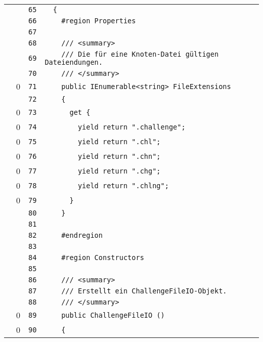 \documentclass[a4paper,10pt]{article}
\begin{document}
\begin{longtable}[l]{lrrl}
\cellcolor{gray} &  & \verb~65~ & \verb~  {~\\
\cellcolor{gray} &  & \verb~66~ & \verb~    #region Properties~\\
\cellcolor{gray} &  & \verb~67~ & \verb~~\\
\cellcolor{gray} &  & \verb~68~ & \verb~    /// <summary>~\\
\cellcolor{gray} &  & \verb~69~ & \verb~    /// Die für eine Knoten-Datei gültigen Dateiendungen.~\\
\cellcolor{gray} &  & \verb~70~ & \verb~    /// </summary>~\\
\cellcolor{red} & 0 & \verb~71~ & \verb~    public IEnumerable<string> FileExtensions~\\
\cellcolor{gray} &  & \verb~72~ & \verb~    {~\\
\cellcolor{red} & 0 & \verb~73~ & \verb~      get {~\\
\cellcolor{red} & 0 & \verb~74~ & \verb~        yield return ".challenge";~\\
\cellcolor{red} & 0 & \verb~75~ & \verb~        yield return ".chl";~\\
\cellcolor{red} & 0 & \verb~76~ & \verb~        yield return ".chn";~\\
\cellcolor{red} & 0 & \verb~77~ & \verb~        yield return ".chg";~\\
\cellcolor{red} & 0 & \verb~78~ & \verb~        yield return ".chlng";~\\
\cellcolor{red} & 0 & \verb~79~ & \verb~      }~\\
\cellcolor{gray} &  & \verb~80~ & \verb~    }~\\
\cellcolor{gray} &  & \verb~81~ & \verb~~\\
\cellcolor{gray} &  & \verb~82~ & \verb~    #endregion~\\
\cellcolor{gray} &  & \verb~83~ & \verb~~\\
\cellcolor{gray} &  & \verb~84~ & \verb~    #region Constructors~\\
\cellcolor{gray} &  & \verb~85~ & \verb~~\\
\cellcolor{gray} &  & \verb~86~ & \verb~    /// <summary>~\\
\cellcolor{gray} &  & \verb~87~ & \verb~    /// Erstellt ein ChallengeFileIO-Objekt.~\\
\cellcolor{gray} &  & \verb~88~ & \verb~    /// </summary>~\\
\cellcolor{red} & 0 & \verb~89~ & \verb~    public ChallengeFileIO ()~\\
\cellcolor{red} & 0 & \verb~90~ & \verb~    {~\\

\end{longtable}
\end{document}
